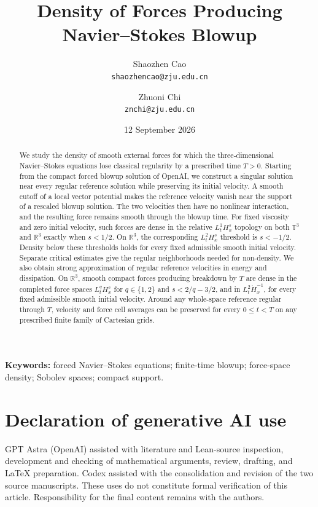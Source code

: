 \documentclass[11pt,a4paper]{article}
\title{Density of Forces Producing\\ Navier--Stokes Blowup}
\author{Shaozhen Cao\\\texttt{shaozhencao@zju.edu.cn}\and
Zhuoni Chi\\\texttt{znchi@zju.edu.cn}}
\date{12 September 2026}
\theoremstyle{definition}\newtheorem{definition}[theorem]{Definition}
\theoremstyle{remark}\newtheorem{remark}[theorem]{Remark}
\newcommand{\R}{\mathbb R}\newcommand{\TT}{\mathbb T^3}
\begin{document}
\maketitle
\begin{abstract}
We study the density of smooth external forces for which the three-dimensional
Navier--Stokes equations lose classical regularity by a prescribed time $T>0$.
Starting from the compact forced blowup solution of OpenAI, we construct a
singular solution near every regular reference solution while preserving its
initial velocity. A smooth cutoff of a local vector potential makes the
reference velocity vanish near the support of a rescaled blowup solution.
The two velocities then have no nonlinear interaction, and the resulting
force remains smooth through the blowup time. For fixed viscosity and zero
initial velocity, such forces are dense in the relative $L^1_tH^s_x$ topology
on both $\TT$ and $\R^3$ exactly when $s<1/2$. On $\R^3$, the corresponding
$L^2_tH^s_x$ threshold is $s<-1/2$. Density below these thresholds holds for
every fixed admissible smooth initial velocity. Separate critical estimates
give the regular neighborhoods needed for non-density. We also obtain strong
approximation of regular reference velocities in energy and dissipation.
On $\R^3$, smooth compact forces producing breakdown by $T$ are dense in
the completed force spaces $L^q_tH^s_x$ for $q\in\{1,2\}$ and
$s<2/q-3/2$, and in
$L^2_t\dot H^{-1}_x$, for every fixed admissible smooth initial velocity.
Around any whole-space reference regular through $T$, velocity and force
cell averages can be preserved for every $0\le t<T$ on any prescribed
finite family of Cartesian grids.
\end{abstract}
\noindent\textbf{Keywords:} forced Navier--Stokes equations; finite-time blowup;
force-space density; Sobolev spaces; compact support.






\appendix


\section*{Declaration of generative AI use}
GPT Astra (OpenAI) assisted with literature and Lean-source inspection,
development and checking of mathematical arguments, review, drafting, and
LaTeX preparation. Codex assisted with the consolidation and revision of
the two source manuscripts. These uses do not constitute formal verification
of this article. Responsibility for the final content remains with the authors.

\end{document}
